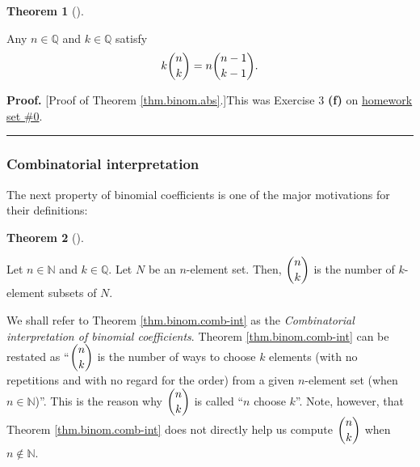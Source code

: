 \documentclass[numbers=enddot,12pt,final,onecolumn,notitlepage]{scrartcl}%
\numberwithin{exer}{subsection}
\theoremstyle{definition}
\newtheorem{theo}{Theorem}[subsection]
\newenvironment{theorem}[1][]
{\begin{theo}[#1]\begin{leftbar}}
{\end{leftbar}\end{theo}}
\newenvironment{proof}[1][Proof]{\noindent\textbf{#1.} }{\ \rule{0.5em}{0.5em}}
\begin{document}
\begin{theorem}
\label{thm.binom.abs}Any $n\in\mathbb{Q}$ and $k\in\mathbb{Q}$ satisfy
\[
k\dbinom{n}{k}=n\dbinom{n-1}{k-1}.
\]

\end{theorem}

\begin{proof}
[Proof of Theorem \ref{thm.binom.abs}.]This was Exercise 3 \textbf{(f)} on
\href{http://www-users.math.umn.edu/~dgrinber/19s/hw0s.pdf}{homework set \#0}.
\end{proof}

\subsubsection{Combinatorial interpretation}

The next property of binomial coefficients is one of the major motivations for
their definitions:

\begin{theorem}
\label{thm.binom.comb-int}Let $n\in\mathbb{N}$ and $k\in\mathbb{Q}$. Let $N$
be an $n$-element set. Then, $\dbinom{n}{k}$ is the number of $k$-element
subsets of $N$.
\end{theorem}

We shall refer to Theorem \ref{thm.binom.comb-int} as the
\textit{Combinatorial interpretation of binomial coefficients}. Theorem
\ref{thm.binom.comb-int} can be restated as \textquotedblleft$\dbinom{n}{k}$
is the number of ways to choose $k$ elements (with no repetitions and with no
regard for the order) from a given $n$-element set (when $n\in\mathbb{N}%
$)\textquotedblright. This is the reason why $\dbinom{n}{k}$ is called
\textquotedblleft$n$ choose $k$\textquotedblright. Note, however, that Theorem
\ref{thm.binom.comb-int} does not directly help us compute $\dbinom{n}{k}$
when $n\notin\mathbb{N}$.
\end{document}

